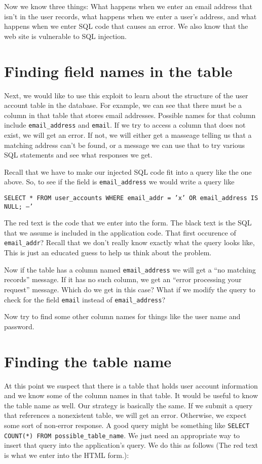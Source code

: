 \documentclass{article}
\begin{document}
Now we know three things:  What happens when we enter an email address that isn't in the user records, what happens when we enter a user's address, and what happens when we enter SQL code that causes an error.  We also know that the web site is vulnerable to SQL injection.

\section{Finding field names in the table}
Next, we would like to use this exploit to learn about the structure of the user account table in the database. For example, we can see that there must be a column in that table that stores email addresses. Possible names for that column include \texttt{email\_address} and \texttt{email}.  If we try to access a column that does not exist, we will get an error. If not, we will either get a masseage telling us that a matching address can't be found, or a message we can use that to try various SQL statements and see what responses we get.

Recall that we have to make our injected SQL code fit into a query like the one above. So, to see if the field is \texttt{email\_address} we would write a query like 

\texttt{SELECT * FROM user\_accounts WHERE email\_addr = '{\color{red}x' OR email\_address IS NULL; --}' }

The red text is the code that we enter into the form. The black text is the SQL that we assume is included in the application code.  That first occurence of \texttt{email\_addr}? Recall that we don't really know exactly what the query looks like, This is just an educated guess to help us think about the problem.

Now if the table has a column named \texttt{email\_address} we will get a ``no matching records'' message. If it has no such column, we get an ``error processing your request'' message. Which do we get in this case? What if we modify the query to check for the field \texttt{email} instead of \texttt{email\_address}?

Now try to find some other column names for things like the user name and password.

\section{Finding the table name}
At this point we suspect that there is a table that holds user account information and we know some of the column names in that table. It would be useful to know the table name as well. Our strategy is basically the same.  If we submit a query that references a nonexistent table, we will get an error.  Otherwise, we expect some sort of non-error response.  A good query might be something like \texttt{SELECT COUNT(*) FROM possible\_table\_name}. We just need an appropriate way to insert that query into the application's query.  We do this as follows (The red text is what we enter into the HTML form.):
\end{document}

